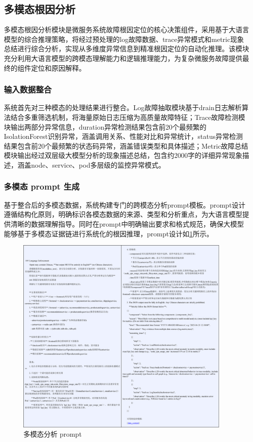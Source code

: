 \documentclass[11pt]{article}
\begin{document}
\subsection{多模态根因分析}

多模态根因分析模块是微服务系统故障根因定位的核心决策组件，采用基于大语言模型的综合推理策略，将经过预处理的log故障数据、trace异常模式和metric现象总结进行综合分析，实现从多维度异常信息到精准根因定位的自动化推理。该模块充分利用大语言模型的跨模态理解能力和逻辑推理能力，为复杂微服务故障提供最终的组件定位和原因解释。

\subsubsection{输入数据整合}

系统首先对三种模态的处理结果进行整合。Log故障抽取模块基于drain日志解析算法结合多重筛选机制，将海量原始日志压缩为高质量故障特征；Trace故障检测模块输出两部分异常信息，duration异常检测结果包含前20个最频繁的IsolationForest识别异常，涵盖调用关系、性能对比和异常统计，status异常检测结果包含前20个最频繁的状态码异常，涵盖错误类型和具体描述；Metric故障总结模块输出经过双层级大模型分析的现象描述总结，包含约2000字的详细异常现象描述，涵盖node、service、pod多层级的监控异常模式。

\subsubsection{多模态 prompt 生成}

基于整合后的多模态数据，系统构建专门的跨模态分析prompt模板。prompt设计遵循结构化原则，明确标识各模态数据的来源、类型和分析重点，为大语言模型提供清晰的数据理解指导。同时在prompt中明确输出要求和格式规范，确保大模型能够基于多模态证据链进行系统化的根因推理，prompt设计如\ref{fig18}所示。

\begin{figure}[htbp]
    \centering
    \includegraphics[width=0.95\textwidth]{pics/fig18.png}
    \caption{多模态分析 prompt}
    \label{fig18}
\end{figure}
\end{document}
